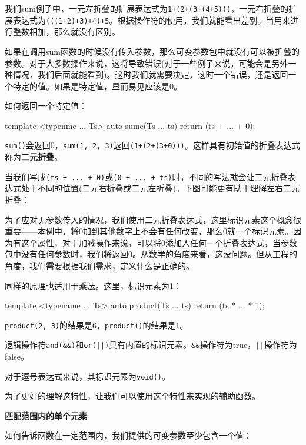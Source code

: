 我们sum例子中，一元左折叠的扩展表达式为\texttt{1+(2+(3+(4+5)))}，一元右折叠的扩展表达式为\texttt{(((1+2)+3)+4)+5}。根据操作符的使用，我们就能看出差别。当用来进行整数相加，那么就没有区别。


如果在调用sum函数的时候没有传入参数，那么可变参数包中就没有可以被折叠的参数。对于大多数操作来说，这将导致错误(对于一些例子来说，可能会是另外一种情况，我们后面就能看到)。这时我们就需要决定，这时一个错误，还是返回一个特定的值。如果是特定值，显而易见应该是0。

如何返回一个特定值：

\begin{codebox}[cpp]
template <typenme ... Ts>
auto sume(Ts ... ts){
    return (ts + ... + 0);
}
\end{codebox}

\texttt{sum()}会返回0，\texttt{sum(1, 2, 3)}返回\texttt{(1+(2+(3+0)))}。这样具有初始值的折叠表达式称为\textbf{二元折叠}。

当我们写成\texttt{(ts + ... + 0)}或\texttt{(0 + ... + ts)}时，不同的写法就会让二元折叠表达式处于不同的位置(二元右折叠或二元左折叠)。下图可能更有助于理解左右二元折叠：


为了应对无参数传入的情况，我们使用二元折叠表达式，这里标识元素这个概念很重要——本例中，将0加到其他数字上不会有任何改变，那么0就一个标识元素。因为有这个属性，对于加减操作来说，可以将0添加入任何一个折叠表达式，当参数包中没有任何参数时，我们将返回0。从数学的角度来看，这没问题。但从工程的角度，我们需要根据我们需求，定义什么是正确的。

同样的原理也适用于乘法。这里，标识元素为1：

\begin{codebox}[cpp]
template <typename ... Ts>
auto product(Ts ... ts){
    return (ts * ... * 1);
}
\end{codebox}

\texttt{product(2, 3)}的结果是6，\texttt{product()}的结果是1。

逻辑操作符\texttt{and(\&\&)}和\texttt{or(||)}具有内置的标识元素。\texttt{\&\&}操作符为true，\texttt{||}操作符为false。

对于逗号表达式来说，其标识元素为\texttt{void()}。

为了更好的理解这特性，让我们可以使用这个特性来实现的辅助函数。

\textbf{匹配范围内的单个元素}

如何告诉函数在一定范围内，我们提供的可变参数至少包含一个值：

